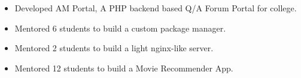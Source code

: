 
\begin{itemize}
  \item Developed AM Portal, A PHP backend based Q/A Forum Portal for college.
  \item Mentored 6 students to build a custom package manager. 
  \item Mentored 2 students to build a light nginx-like server.
  \item Mentored 12 students to build a Movie Recommender App.
    \vspace{-1mm}
\end{itemize}